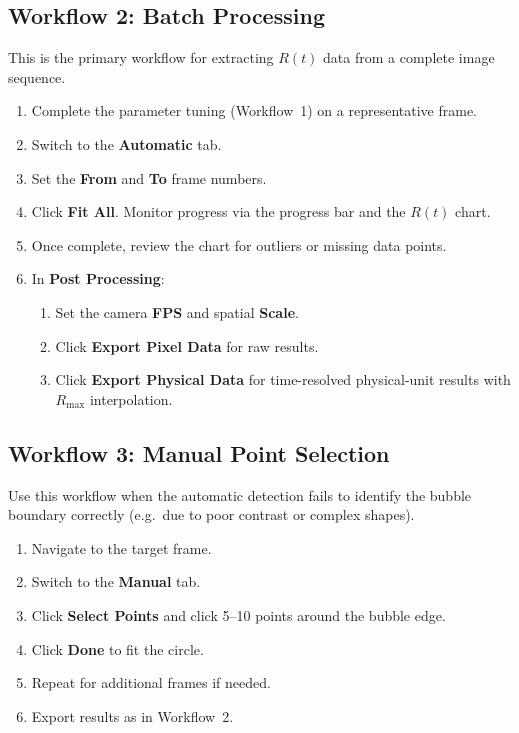 \documentclass[11pt, letterpaper]{article}
\begin{document}
\subsection{Workflow 2: Batch Processing}

This is the primary workflow for extracting $R(t)$ data from a complete image
sequence.

\begin{enumerate}
    \item Complete the parameter tuning (Workflow~1) on a representative frame.
    \item Switch to the \textbf{Automatic} tab.
    \item Set the \textbf{From} and \textbf{To} frame numbers.
    \item Click \textbf{Fit All}. Monitor progress via the progress bar and
          the $R(t)$ chart.
    \item Once complete, review the chart for outliers or missing data points.
    \item In \textbf{Post Processing}:
    \begin{enumerate}[label=\alph*.]
        \item Set the camera \textbf{FPS} and spatial \textbf{Scale}.
        \item Click \textbf{Export Pixel Data} for raw results.
        \item Click \textbf{Export Physical Data} for time-resolved
              physical-unit results with $R_{\max}$ interpolation.
    \end{enumerate}
\end{enumerate}

\subsection{Workflow 3: Manual Point Selection}

Use this workflow when the automatic detection fails to identify the bubble
boundary correctly (e.g.\ due to poor contrast or complex shapes).

\begin{enumerate}
    \item Navigate to the target frame.
    \item Switch to the \textbf{Manual} tab.
    \item Click \textbf{Select Points} and click 5--10 points around the
          bubble edge.
    \item Click \textbf{Done} to fit the circle.
    \item Repeat for additional frames if needed.
    \item Export results as in Workflow~2.
\end{enumerate}
\end{document}
